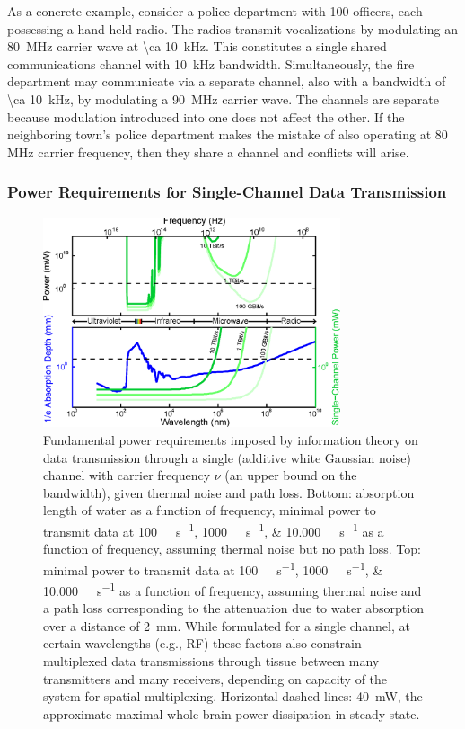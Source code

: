 As a concrete example, consider a police department with \num{100} officers, each possessing a hand-held radio.
The radios transmit vocalizations by modulating an \SI{80}{\mega\hertz} carrier wave at \SI{\ca 10}{\kilo\hertz}.
This constitutes a single shared communications channel with \SI{10}{\kilo\hertz} bandwidth.
Simultaneously, the fire department may communicate via a separate channel, also with a bandwidth of \SI{\ca 10}{\kilo\hertz}, by modulating a \SI{90}{\mega\hertz} carrier wave.
The channels are separate because modulation introduced into one does not affect the other.
If the neighboring town's police department makes the mistake of also operating at 80 MHz carrier frequency, then they share a channel and conflicts will arise.

\subsubsection{Power Requirements for Single-Channel Data Transmission}

\begin{figure}[htbp]
\caption{%
Fundamental power requirements imposed by information theory on data transmission through a single (additive white Gaussian noise) channel with carrier frequency $\nu$ (an upper bound on the bandwidth), given thermal noise and path loss.
Bottom: absorption length of water as a function of frequency, minimal power to transmit data at \SIlist{100;1000;10,000}{\giga\bit\per\second} as a function of frequency, assuming thermal noise but no path loss.
Top: minimal power to transmit data at \SIlist{100;1000;10,000}{\giga\bit\per\second} as a function of frequency, assuming thermal noise and a path loss corresponding to the attenuation due to water absorption over a distance of \SI{2}{\milli\meter}.
While formulated for a single channel, at certain wavelengths (e.g., RF) these factors also constrain multiplexed data transmissions through tissue between many transmitters and many receivers, depending on capacity of the system for spatial multiplexing.
Horizontal dashed lines: \SI{40}{\milli\watt}, the approximate maximal whole-brain power dissipation in steady state.
}
\label{fig:rfpower}
\centering
\includegraphics[width=0.78\textwidth]{figs/Fig5.eps}
\end{figure}


